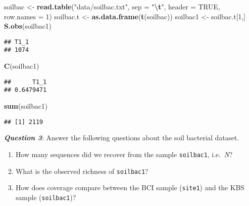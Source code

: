 \documentclass[
]{article}
\newenvironment{Shaded}{\begin{snugshade}}{\end{snugshade}}
\newcommand{\AttributeTok}[1]{\textcolor[rgb]{0.13,0.29,0.53}{#1}}
\newcommand{\ConstantTok}[1]{\textcolor[rgb]{0.56,0.35,0.01}{#1}}
\newcommand{\DecValTok}[1]{\textcolor[rgb]{0.00,0.00,0.81}{#1}}
\newcommand{\FunctionTok}[1]{\textcolor[rgb]{0.13,0.29,0.53}{\textbf{#1}}}
\newcommand{\NormalTok}[1]{#1}
\newcommand{\OtherTok}[1]{\textcolor[rgb]{0.56,0.35,0.01}{#1}}
\newcommand{\SpecialCharTok}[1]{\textcolor[rgb]{0.81,0.36,0.00}{\textbf{#1}}}
\newcommand{\StringTok}[1]{\textcolor[rgb]{0.31,0.60,0.02}{#1}}
\providecommand{\tightlist}{%
  \setlength{\itemsep}{0pt}\setlength{\parskip}{0pt}}
\begin{document}
\begin{Shaded}
\begin{Highlighting}[]
\NormalTok{soilbac }\OtherTok{\textless{}{-}} \FunctionTok{read.table}\NormalTok{(}\StringTok{"data/soilbac.txt"}\NormalTok{, }\AttributeTok{sep =} \StringTok{"}\SpecialCharTok{\textbackslash{}t}\StringTok{"}\NormalTok{, }\AttributeTok{header =} \ConstantTok{TRUE}\NormalTok{, }\AttributeTok{row.names =} \DecValTok{1}\NormalTok{) }
\NormalTok{soilbac.t }\OtherTok{\textless{}{-}} \FunctionTok{as.data.frame}\NormalTok{(}\FunctionTok{t}\NormalTok{(soilbac))}
\NormalTok{soilbac1 }\OtherTok{\textless{}{-}}\NormalTok{ soilbac.t[}\DecValTok{1}\NormalTok{,]}
\FunctionTok{S.obs}\NormalTok{(soilbac1)}
\end{Highlighting}
\end{Shaded}

\begin{verbatim}
## T1_1 
## 1074
\end{verbatim}

\begin{Shaded}
\begin{Highlighting}[]
\FunctionTok{C}\NormalTok{(soilbac1)}
\end{Highlighting}
\end{Shaded}

\begin{verbatim}
##      T1_1 
## 0.6479471
\end{verbatim}

\begin{Shaded}
\begin{Highlighting}[]
\FunctionTok{sum}\NormalTok{(soilbac1)}
\end{Highlighting}
\end{Shaded}

\begin{verbatim}
## [1] 2119
\end{verbatim}

\textbf{\emph{Question 3}}: Answer the following questions about the
soil bacterial dataset.

\begin{enumerate}
\def\labelenumi{\alph{enumi}.}
\tightlist
\item
  How many sequences did we recover from the sample \texttt{soilbac1},
  i.e.~\emph{N}?
\item
  What is the observed richness of \texttt{soilbac1}?
\item
  How does coverage compare between the BCI sample (\texttt{site1}) and
  the KBS sample (\texttt{soilbac1})?
\end{enumerate}
\end{document}
